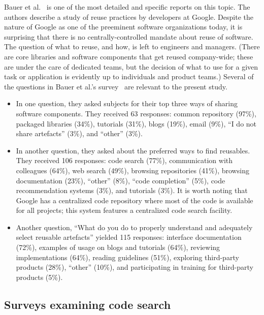 \documentclass{casicswhitepaper}
\begin{document}
Bauer et al.~\cite{bauer2014exploratory} is one of the most detailed and specific reports on this topic.  The authors describe a study of reuse practices by developers at Google.  Despite the nature of Google as one of the preeminent software organizations today, it is surprising that there is no centrally-controlled mandate about reuse of software.  The question of what to reuse, and how, is left to engineers and managers.  (There are core libraries and software components that get reused company-wide; these are under the care of dedicated teams, but the decision of what to use for a given task or application is evidently up to individuals and product teams.)  Several of the questions in Bauer et al.'s survey~\cite{bauer2014exploratory} are relevant to the present study.
\begin{itemize}

\item In one question, they asked subjects for their top three ways of sharing software components.  They received 63 responses: common repository (97\%), packaged libraries (34\%), tutorials (31\%), blogs (19\%), email (9\%), ``I do not share artefacts'' (3\%), and ``other'' (3\%).

\item In another question, they asked about the preferred ways to find reusables.  They received 106 responses: code search (77\%), communication with colleagues (64\%), web search (49\%), browsing repositories (41\%), browsing documentation (23\%), ``other'' (8\%), ``code completion'' (5\%), code recommendation systems (3\%), and tutorials (3\%).  It is worth noting that Google has a centralized code repository where most of the code is available for all projects; this system features a centralized code search facility.

\item Another question, ``What do you do to properly understand and adequately select reusable artefacts'' yielded 115 responses: interface documentation (72\%), examples of usage on blogs and tutorials (64\%), reviewing implementations (64\%), reading guidelines (51\%), exploring third-party products (28\%), ``other'' (10\%), and participating in training for third-party products (5\%).

\end{itemize}

\subsection{Surveys examining code search}
\end{document}
